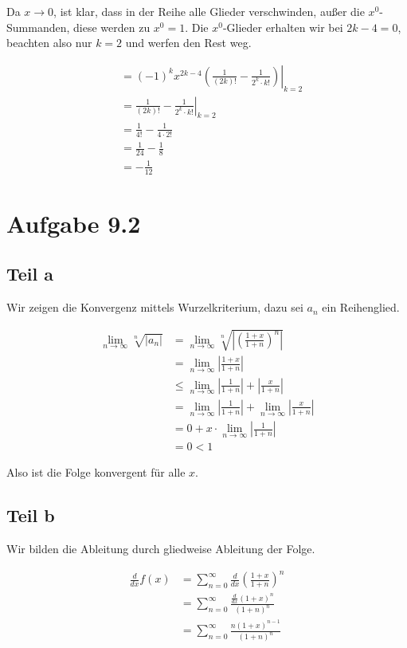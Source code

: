 \documentclass[a4paper,german,12pt,smallheadings]{scrartcl}
\begin{document}
Da $x \to 0$, ist klar, dass in der Reihe alle Glieder verschwinden, außer die
$x^0$-Summanden, diese werden zu $x^0 = 1$. Die $x^0$-Glieder erhalten wir bei
$2k-4 = 0$, beachten also nur $k=2$ und werfen den Rest weg.

\begin{align*}
   &= \left.(-1)^k x^{2k-4} \left(\frac{1}{(2k)!} - \frac{1}{2^k \cdot k!}\right)\right|_{k=2} \\
   &= \left.\frac{1}{(2k)!} - \frac{1}{2^k \cdot k!}\right|_{k=2} \\
   &= \frac{1}{4!} - \frac{1}{4\cdot 2!} \\
   &= \frac{1}{24} - \frac{1}{8} \\
   &= -\frac{1}{12}
\end{align*}

\section*{Aufgabe 9.2}
\subsection*{Teil a}

Wir zeigen die Konvergenz mittels Wurzelkriterium, dazu sei $a_n$ ein
Reihenglied.

\begin{align*}
  \lim_{n \to \infty} \sqrt[n]{|a_n|} &= \lim_{n \to \infty} \sqrt[n]{\left|\left(\frac{1+x}{1+n}\right)^n\right|} \\
  &= \lim_{n \to \infty} \left|\frac{1+x}{1+n}\right| \\
  &\le \lim_{n \to \infty} \left|\frac{1}{1+n}\right| + \left|\frac{x}{1+n}\right|\\
  &= \lim_{n \to \infty} \left|\frac{1}{1+n}\right| + \lim_{n \to \infty} \left|\frac{x}{1+n}\right|\\
  &= 0 + x \cdot \lim_{n \to \infty} \left|\frac{1}{1+n}\right|\\
  &= 0 < 1
\end{align*}

Also ist die Folge konvergent für alle $x$.

\subsection*{Teil b}
Wir bilden die Ableitung durch gliedweise Ableitung der Folge.

\begin{align*}
  \frac{d}{dx} f(x) &= \sum_{n=0}^\infty \frac{d}{dx} \left(\frac{1+x}{1+n}\right)^n \\
  &= \sum_{n=0}^\infty \frac{\frac{d}{dx} (1+x)^n}{(1+n)^n} \\
  &= \sum_{n=0}^\infty \frac{n (1+x)^{n-1}}{(1+n)^n}
\end{align*}
\end{document}
